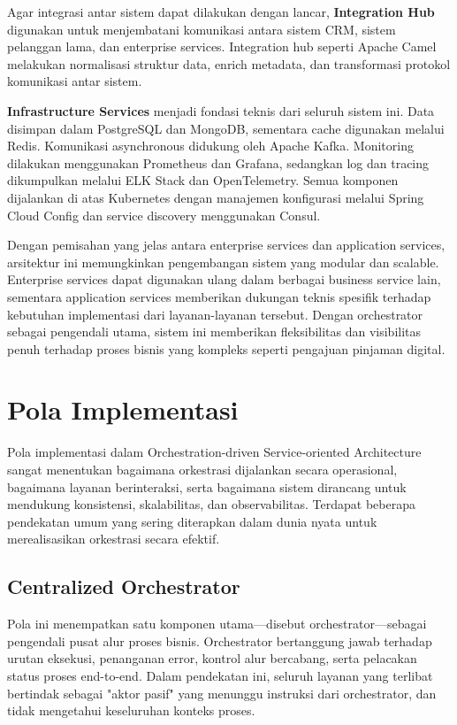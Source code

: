 Agar integrasi antar sistem dapat dilakukan dengan lancar, \textbf{Integration Hub} digunakan untuk menjembatani komunikasi antara sistem CRM, sistem pelanggan lama, dan enterprise services. Integration hub seperti Apache Camel melakukan normalisasi struktur data, enrich metadata, dan transformasi protokol komunikasi antar sistem.

\textbf{Infrastructure Services} menjadi fondasi teknis dari seluruh sistem ini. Data disimpan dalam PostgreSQL dan MongoDB, sementara cache digunakan melalui Redis. Komunikasi asynchronous didukung oleh Apache Kafka. Monitoring dilakukan menggunakan Prometheus dan Grafana, sedangkan log dan tracing dikumpulkan melalui ELK Stack dan OpenTelemetry. Semua komponen dijalankan di atas Kubernetes dengan manajemen konfigurasi melalui Spring Cloud Config dan service discovery menggunakan Consul.

Dengan pemisahan yang jelas antara enterprise services dan application services, arsitektur ini memungkinkan pengembangan sistem yang modular dan scalable. Enterprise services dapat digunakan ulang dalam berbagai business service lain, sementara application services memberikan dukungan teknis spesifik terhadap kebutuhan implementasi dari layanan-layanan tersebut. Dengan orchestrator sebagai pengendali utama, sistem ini memberikan fleksibilitas dan visibilitas penuh terhadap proses bisnis yang kompleks seperti pengajuan pinjaman digital.


\section{Pola Implementasi}

Pola implementasi dalam Orchestration-driven Service-oriented Architecture sangat menentukan bagaimana orkestrasi dijalankan secara operasional, bagaimana layanan berinteraksi, serta bagaimana sistem dirancang untuk mendukung konsistensi, skalabilitas, dan observabilitas. Terdapat beberapa pendekatan umum yang sering diterapkan dalam dunia nyata untuk merealisasikan orkestrasi secara efektif.

\subsection{Centralized Orchestrator}

Pola ini menempatkan satu komponen utama—disebut orchestrator—sebagai pengendali pusat alur proses bisnis. Orchestrator bertanggung jawab terhadap urutan eksekusi, penanganan error, kontrol alur bercabang, serta pelacakan status proses end-to-end. Dalam pendekatan ini, seluruh layanan yang terlibat bertindak sebagai "aktor pasif" yang menunggu instruksi dari orchestrator, dan tidak mengetahui keseluruhan konteks proses.

